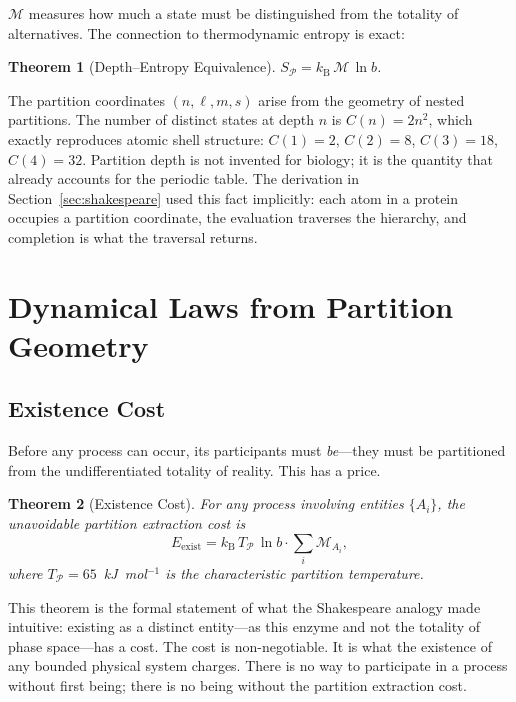 \documentclass[11pt,twocolumn,a4paper]{article}
\newtheorem{theorem}{Theorem}[section]
\theoremstyle{definition}
\theoremstyle{remark}
\newcommand{\kB}{k_{\mathrm{B}}}
\newcommand{\Depth}{\mathcal{M}}
\newcommand{\Part}{\mathcal{P}}
\newcommand{\Tpart}{T_{\Part}}
\begin{document}
$\Depth$ measures how much a state must be distinguished from the totality of
alternatives.  The connection to thermodynamic entropy is exact:

\begin{theorem}[Depth--Entropy Equivalence]
\label{thm:entropy}
$S_{\Part} = \kB\,\Depth\,\ln b$.
\end{theorem}

The partition coordinates $(n, \ell, m, s)$ arise from the geometry of nested
partitions.  The number of distinct states at depth $n$ is $C(n) = 2n^2$,
which exactly reproduces atomic shell structure: $C(1) = 2$, $C(2) = 8$,
$C(3) = 18$, $C(4) = 32$.  Partition depth is not invented for biology; it is
the quantity that already accounts for the periodic table.  The derivation in
Section~\ref{sec:shakespeare} used this fact implicitly: each atom in a
protein occupies a partition coordinate, the evaluation traverses the hierarchy,
and completion is what the traversal returns.

\section{Dynamical Laws from Partition Geometry}
\label{sec:dynamics}

\subsection{Existence Cost}

Before any process can occur, its participants must \emph{be}---they must be
partitioned from the undifferentiated totality of reality.  This has a price.

\begin{theorem}[Existence Cost]
\label{thm:existence}
For any process involving entities $\{A_i\}$, the unavoidable partition
extraction cost is
\begin{equation}
    E_{\mathrm{exist}} = \kB\,\Tpart\,\ln b \cdot \sum_i \Depth_{A_i},
    \label{eq:exist}
\end{equation}
where $\Tpart = 65$~kJ~mol$^{-1}$ is the characteristic partition temperature.
\end{theorem}

This theorem is the formal statement of what the Shakespeare analogy made
intuitive: existing as a distinct entity---as this enzyme and not the
totality of phase space---has a cost.  The cost is non-negotiable.  It is what
the existence of any bounded physical system charges.  There is no way to
participate in a process without first being; there is no being without the
partition extraction cost.
\end{document}
